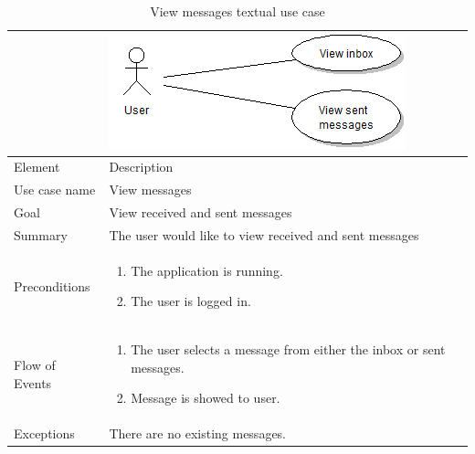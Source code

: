 \begin{table}
\begin{tabular}{p{3cm}p{12cm}}
& \includegraphics{view_messages}\\ \hline
Element & Description \\ \hline
Use case name & View messages \\
Goal & View received and sent messages \\
Summary &The user would like to view received and sent messages \\
Preconditions &
\begin{enumerate}
\item{}The application is running.
\item{}The user is logged in.
\end{enumerate} \\ \hline
Flow of Events &
\begin{enumerate}
\item{}The user selects a message from either the inbox or sent messages.
\item{}Message is showed to user.
\end{enumerate} \\ \hline
Exceptions & There are no existing messages.
\end{tabular}
\caption{View messages textual use case} \label{tab:viewmessages}
\end{table}

